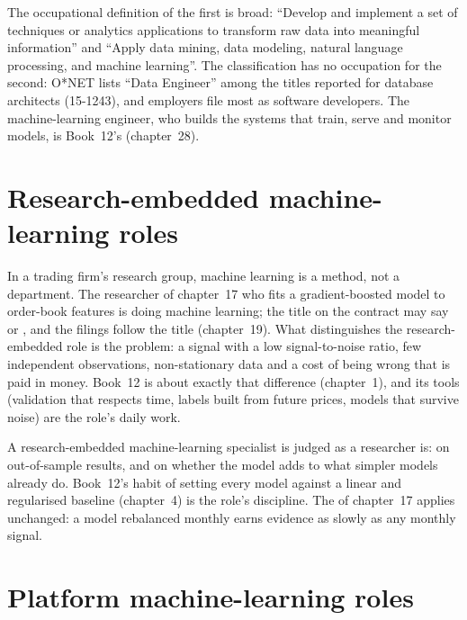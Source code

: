 The occupational definition of the first is broad:  ``Develop and implement a set of techniques or
analytics applications to transform raw data into meaningful information'' and ``Apply data mining, data modeling,
natural language processing, and machine learning''. The classification has no occupation for the second: O*NET lists
``Data Engineer'' among the titles reported for database architects (15-1243), and employers file most  as
software developers. The machine-learning engineer, who builds the systems that train, serve and monitor models, is
Book~12's (chapter~28).

\section{Research-embedded machine-learning roles}

In a trading firm's research group, machine learning is a method, not a department. The researcher of chapter~17 who fits
a gradient-boosted model to order-book features is doing machine learning; the title on the contract may say
 or , and the filings follow the title (chapter~19). What distinguishes the
research-embedded role is the problem: a signal with a low signal-to-noise ratio, few independent observations,
non-stationary data and a cost of being wrong that is paid in money. Book~12 is about exactly that difference
(chapter~1), and its tools (validation that respects time, labels built from future prices, models that survive noise)
are the role's daily work.

A research-embedded machine-learning specialist is judged as a researcher is: on out-of-sample results, and on whether the
model adds to what simpler models already do. Book~12's habit of setting every model against a linear and regularised
baseline (chapter~4) is the role's discipline. The  of chapter~17 applies unchanged: a model rebalanced monthly
earns evidence as slowly as any monthly signal.

\section{Platform machine-learning roles}

